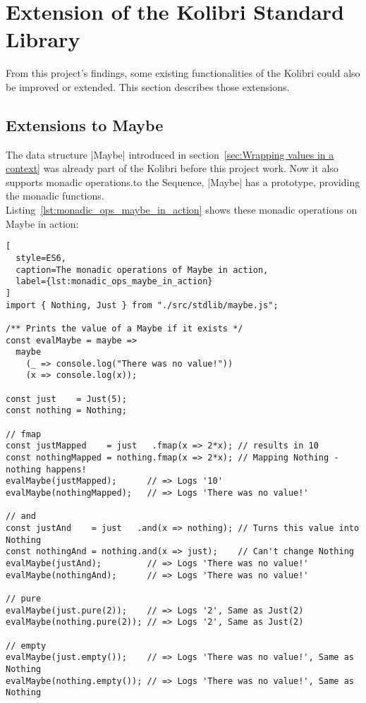 \section{Extension of the Kolibri Standard Library}
\label{sec:Extension of the Kolibri Standard Library}
From this project's findings, some existing functionalities of the Kolibri
could also be improved or extended. This section describes those extensions.

\subsection{Extensions to Maybe} %
\label{sub:Extensions to Maybe}
The data structure |Maybe| introduced in section~\ref{sec:Wrapping values in a
context} was already part of the Kolibri before this project work. Now it also
supports monadic operations.to the Sequence, |Maybe| has a prototype, providing
the monadic functions. \\ 
Listing~\ref{lst:monadic_ops_maybe_in_action} shows these monadic operations on
Maybe in action:

\begin{lstlisting}[
  style=ES6,
  caption=The monadic operations of Maybe in action,
  label={lst:monadic_ops_maybe_in_action}
]
import { Nothing, Just } from "./src/stdlib/maybe.js";

/** Prints the value of a Maybe if it exists */
const evalMaybe = maybe =>
  maybe
    (_ => console.log("There was no value!"))
    (x => console.log(x));

const just    = Just(5);
const nothing = Nothing;

// fmap 
const justMapped    = just   .fmap(x => 2*x); // results in 10
const nothingMapped = nothing.fmap(x => 2*x); // Mapping Nothing - nothing happens!
evalMaybe(justMapped);      // => Logs '10'
evalMaybe(nothingMapped);   // => Logs 'There was no value!' 

// and
const justAnd    = just   .and(x => nothing); // Turns this value into Nothing
const nothingAnd = nothing.and(x => just);    // Can't change Nothing
evalMaybe(justAnd);         // => Logs 'There was no value!'
evalMaybe(nothingAnd);      // => Logs 'There was no value!' 

// pure
evalMaybe(just.pure(2));    // => Logs '2', Same as Just(2)
evalMaybe(nothing.pure(2)); // => Logs '2', Same as Just(2)

// empty
evalMaybe(just.empty());    // => Logs 'There was no value!', Same as Nothing
evalMaybe(nothing.empty()); // => Logs 'There was no value!', Same as Nothing
\end{lstlisting}

